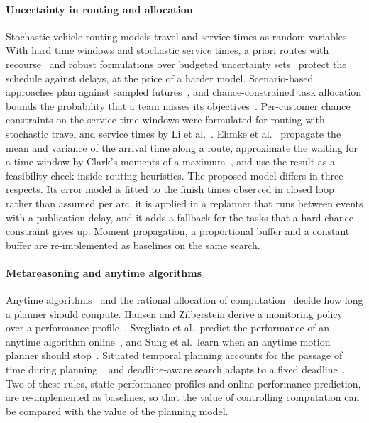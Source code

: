 \paragraph{Uncertainty in routing and allocation} Stochastic vehicle routing models travel and service times as random
variables~\cite{gendreau1996stochastic}. With hard time windows and stochastic service times, a priori routes with
recourse~\cite{errico2016apriori} and robust formulations over budgeted uncertainty
sets~\cite{agra2013robust} protect the schedule against delays, at the price of a harder model. Scenario-based
approaches plan against sampled futures~\cite{bent2004scenario}, and chance-constrained task allocation bounds the
probability that a team misses its objectives~\cite{ponda2012chance}. Per-customer chance constraints on the service
time windows were formulated for routing with stochastic travel and service times by Li et al.~\cite{li2010vrptw}.
Ehmke et al.~\cite{ehmke2015ensuring} propagate the mean and variance of the arrival time along a route, approximate
the waiting for a time window by Clark's moments of a maximum~\cite{clark1961greatest}, and use the result as a
feasibility check inside routing heuristics. The proposed model differs in three respects. Its error model is fitted
to the finish times observed in closed loop rather than assumed per arc, it is applied in a replanner that runs between
events with a publication delay, and it adds a fallback for the tasks that a hard chance constraint gives up. Moment
propagation, a proportional buffer and a constant buffer are re-implemented as baselines on the same search.

\paragraph{Metareasoning and anytime algorithms} Anytime algorithms~\cite{dean1988analysis,zilberstein1996using} and the
rational allocation of computation~\cite{russell1991right,boddy1994deliberation} decide how long a
planner should compute. Hansen and Zilberstein derive a monitoring policy over a performance
profile~\cite{hansen2001monitoring}. Svegliato et al.\ predict the performance of an anytime algorithm
online~\cite{svegliato2018meta}, and Sung
et al.\ learn when an anytime motion planner should stop~\cite{sung2021quit}. Situated temporal planning accounts for
the passage of time during planning~\cite{cashmore2018clock,shperberg2021situated}, and
deadline-aware search adapts to a fixed deadline~\cite{dionne2011deadline}. Two of these rules, static performance
profiles and online performance prediction, are re-implemented as baselines, so that the value of controlling
computation can be compared with the value of the planning model.
